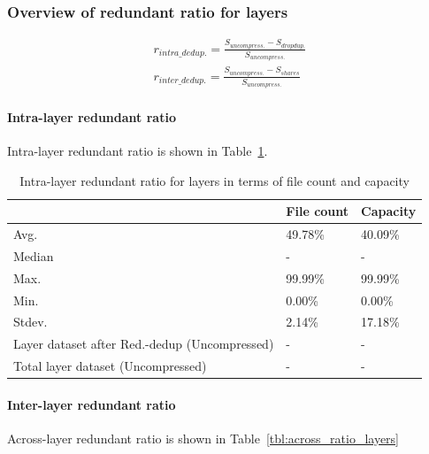\subsubsection{Overview of redundant ratio for layers}

\begin{eqnarray}
r_{intra\_dedup.} = \frac{S_{uncompress.} - S_{dropdup.}}{S_{uncompress.}} \\
r_{inter\_dedup.} = \frac{S_{uncompress.} - S_{shares}}{S_{uncompress.}}
\end{eqnarray}

\paragraph{Intra-layer redundant ratio} Intra-layer redundant ratio is shown in Table~\ref{tbl:per_ratio_layers}.

\begin{table} 
	\centering 
	\scriptsize  
	\caption{Intra-layer redundant ratio for layers in terms of file count and capacity} \label{tbl:per_ratio_layers} 
	\begin{tabular}{|l|l|l|}%
		\hline 
		& File count & Capacity \\
		\hline
		Avg. & 49.78\% & 40.09\%\\
		\hline
		Median & - & - \\
		\hline
		Max. & 99.99\% & 99.99\%\\
		\hline
		Min.  & 0.00\%  & 0.00\%\\
		\hline
		Stdev.  &  2.14\% & 17.18\%\\
		\hline
		Layer dataset after Red.-dedup (Uncompressed) & -  & -\\
		\hline 
		Total layer dataset (Uncompressed) &  -	& -\\
		\hline 
	\end{tabular} 
\end{table}

\paragraph{Inter-layer redundant ratio} Across-layer redundant ratio is shown in Table~\ref{tbl:across_ratio_layers}

